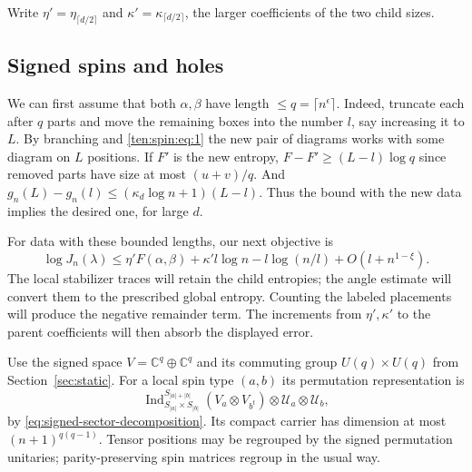 Write $\eta'=\eta_{\lceil d/2\rceil}$ and
$\kappa'=\kappa_{\lceil d/2\rceil}$, the larger coefficients of the
two child sizes.

\subsection{Signed spins and holes}
We can first assume that both \(\alpha,\beta\) have length \(\le q=\lceil n^\epsilon\rceil\). Indeed, truncate each after \(q\) parts and move the remaining boxes into the number \(l\), say increasing it to \(L\). By branching and \eqref{ten:spin:eq:1} the new pair of diagrams works with some diagram on \(L\) positions. If \(F'\) is the new entropy, \(F-F'\ge (L-l)\log q\) since removed parts have size at most \((u+v)/q\). And \(g_n(L)-g_n(l)\le (\kappa_d\log n+1)(L-l)\). Thus the bound with the new data implies the desired one, for large \(d\).

For data with these bounded lengths, our next objective is
\[
 \log J_n(\lambda)
 \le\eta' F(\alpha,\beta)+\kappa'l\log n-l\log(n/l)
                       +O(l+n^{1-\xi}).
\]
The local stabilizer traces will retain the child entropies; the
angle estimate will convert them to the prescribed global entropy.
Counting the labeled placements will produce the negative remainder
term. The increments from $\eta',\kappa'$ to the parent coefficients
will then absorb the displayed error.

Use the signed space $V=\mathbb C^q\oplus\mathbb C^q$ and its
commuting group $U(q)\times U(q)$ from Section~\ref{sec:static}.
For a local spin type $(a,b)$ its permutation representation is
\begin{equation}
 \operatorname{Ind}_{S_{|a|}\times S_{|b|}}^{S_{|a|+|b|}}
        (V_a\otimes V_{b^t})\otimes\mathcal U_a\otimes\mathcal U_b,
 \label{ten:spin:eq:8}
\end{equation}
by \eqref{eq:signed-sector-decomposition}. Its compact carrier has
dimension at most $(n+1)^{q(q-1)}$. Tensor positions may be regrouped
by the signed permutation unitaries; parity-preserving spin matrices
regroup in the usual way.

